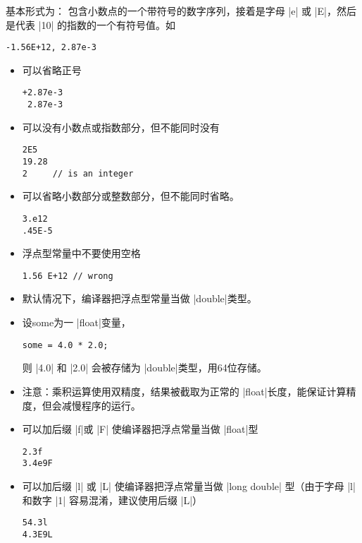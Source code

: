\begin{frame}[fragile]
基本形式为：
包含小数点的一个带符号的数字序列，接着是字母 \lst|e| 或 \lst|E|，然后是代表 \lst|10| 的指数的一个有符号值。如
\begin{lstlisting}
-1.56E+12, 2.87e-3
\end{lstlisting}
\end{frame}
%
\begin{frame}[fragile]
\begin{itemize}
\item 可以省略正号
\begin{lstlisting}
+2.87e-3
 2.87e-3
\end{lstlisting}
\item 可以没有小数点或指数部分，但不能同时没有
\begin{lstlisting}
2E5
19.28
2     // is an integer
\end{lstlisting}
\item 可以省略小数部分或整数部分，但不能同时省略。
\begin{lstlisting}
3.e12
.45E-5
\end{lstlisting}
\end{itemize}
\end{frame}
%
\begin{frame}[fragile]
\begin{itemize}
\item 浮点型常量中不要使用空格
\begin{lstlisting}
1.56 E+12 // wrong
\end{lstlisting}
\item 默认情况下，编译器把浮点型常量当做 \lst|double|类型。\\[0.1in]
\item[] 设some为一 \lst|float|变量，
\begin{lstlisting}
some = 4.0 * 2.0;
\end{lstlisting}
则 \lst|4.0| 和 \lst|2.0| 会被存储为 \lst|double|类型，用64位存储。
\\[0.1in]
\item[] 注意：乘积运算使用双精度，结果被截取为正常的 \lst|float|长度，能保证计算精度，但会减慢程序的运行。
\end{itemize}
\end{frame}
%
\begin{frame}[fragile]
\begin{itemize}
\item 可以加后缀 \lst|f|或 \lst|F| 使编译器把浮点常量当做 \lst|float|型
\begin{lstlisting}
2.3f
3.4e9F
\end{lstlisting}
\item 可以加后缀 \lst|l| 或 \lst|L| 使编译器把浮点常量当做 \lst|long double| 型（由于字母 \lst|l| 和数字 \lst|1| 容易混淆，建议使用后缀 \lst|L|）
\begin{lstlisting}
54.3l
4.3E9L
\end{lstlisting}
\end{itemize}
\end{frame}

